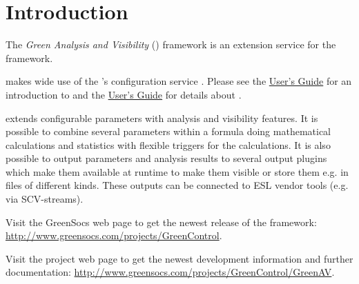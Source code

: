 
\chapter{Introduction}

The {\em Green Analysis and Visibility} (\GreenAV) framework is an extension service for the \GreenControl framework. 

\GreenAV makes wide use of the \GreenControl's configuration service \GreenConfig. 
Please see the \href{http://www.greensocs.com/projects/GreenControl/docs/GCUsersGuide}{\GreenControl User's Guide} for an introduction to \GreenControl and the \href{http://www.greensocs.com/projects/GreenControl/GreenConfig/docs/GCnfUsersGuide}{\GreenConfig User's Guide} for details about \GreenConfig.

\GreenAV extends configurable parameters with analysis and visibility features. It is possible to combine several parameters within a formula doing mathematical calculations and statistics with flexible triggers for the calculations. It is also possible to output parameters and analysis results to several output plugins which make them available at runtime to make them visible or store them e.g. in files of different kinds. These outputs can be connected to ESL vendor tools (e.g. via SCV-streams).

Visit the GreenSocs web page to get the newest release of the \GreenControl framework: \newline
\href{http://www.greensocs.com/projects/GreenControl}{http://www.greensocs.com/projects/GreenControl}.

Visit the \GreenAV project web page to get the newest development information and further documentation:
\hypertarget{GAVProjectWebPage}{\href{http://www.greensocs.com/projects/GreenControl/GreenAV}{http://www.greensocs.com/projects/GreenControl/GreenAV}}.